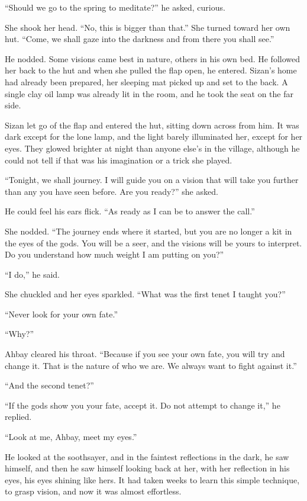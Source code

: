 ``Should we go to the spring to meditate?'' he asked, curious.

She shook her head. ``No, this is bigger than that.'' She turned toward her own hut. ``Come, we shall gaze into the darkness and from there you shall see.''

He nodded. Some visions came best in nature, others in his own bed. He followed her back to the hut and when she pulled the flap open, he entered. Sizan's home had already been prepared, her sleeping mat picked up and set to the back. A single clay oil lamp was already lit in the room, and he took the seat on the far side.

Sizan let go of the flap and entered the hut, sitting down across from him. It was dark except for the lone lamp, and the light barely illuminated her, except for her eyes. They glowed brighter at night than anyone else's in the village, although he could not tell if that was his imagination or a trick she played.

``Tonight, we shall journey. I will guide you on a vision that will take you further than any you have seen before. Are you ready?'' she asked.

He could feel his ears flick. ``As ready as I can be to answer the call.''

She nodded. ``The journey ends where it started, but you are no longer a kit in the eyes of the gods. You will be a seer, and the visions will be yours to interpret. Do you understand how much weight I am putting on you?''

``I do,'' he said.

She chuckled and her eyes sparkled. ``What was the first tenet I taught you?''

``Never look for your own fate.''

``Why?''

Ahbay cleared his throat. ``Because if you see your own fate, you will try and change it. That is the nature of who we are. We always want to fight against it.''

``And the second tenet?''

``If the gods show you your fate, accept it. Do not attempt to change it,'' he replied.

``Look at me, Ahbay, meet my eyes.''

He looked at the soothsayer, and in the faintest reflections in the dark, he saw himself, and then he saw himself looking back at her, with her reflection in his eyes, his eyes shining like hers. It had taken weeks to learn this simple technique, to grasp vision, and now it was almost effortless.

